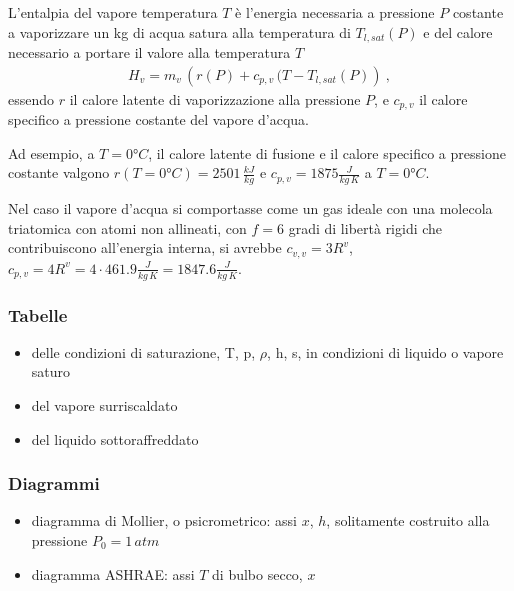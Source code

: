 \documentclass[letterpaper,10pt,italian]{jupyterBook}
\begin{document}
\sphinxAtStartPar
L’entalpia del vapore temperatura \(T\) è l’energia necessaria a pressione \(P\) costante a vaporizzare un kg di acqua satura alla temperatura di \(T_{l,sat}(P)\) e del calore necessario a portare il valore alla temperatura \(T\)
\begin{equation*}
\begin{split}H_v = m_v \, \left( r(P) + c_{p,v} \, (T-T_{l,sat}(P) \right) \ , \end{split}
\end{equation*}
\sphinxAtStartPar
essendo \(r\) il calore latente di vaporizzazione alla pressione \(P\), e \(c_{p,v}\) il calore specifico a pressione costante del vapore d’acqua.

\sphinxAtStartPar
Ad esempio, a \(T = 0°C\), il calore latente di fusione e il calore specifico a pressione costante valgono \(r(T = 0°C) = 2501 \, \frac{kJ}{kg}\) e \(c_{p,v} = 1875 \frac{J}{kg \, K}\) a \(T = 0°C\).

\sphinxAtStartPar
{}  Nel caso il vapore d’acqua si comportasse come un gas ideale con una molecola tri\sphinxhyphen{}atomica con atomi non allineati, con \(f = 6\) gradi di libertà rigidi che contribuiscono all’energia interna, si avrebbe \(c_{v,v} = 3 R^{v}\), \(c_{p,v} = 4 R^{v} = 4 \cdot 461.9 \frac{J}{kg \, K} = 1847.6 \frac{J}{kg \, K}\).


\subsubsection{Tabelle}
\label{\detokenize{ch/thermodynamics/humid-air:tabelle}}\begin{itemize}
\item {} 
\sphinxAtStartPar
delle condizioni di saturazione, T, p, \(\rho\), h, s, in condizioni di liquido o vapore saturo

\item {} 
\sphinxAtStartPar
del vapore surriscaldato

\item {} 
\sphinxAtStartPar
del liquido sottoraffreddato

\end{itemize}


\subsubsection{Diagrammi}
\label{\detokenize{ch/thermodynamics/humid-air:diagrammi}}\begin{itemize}
\item {} 
\sphinxAtStartPar
diagramma di Mollier, o psicrometrico: assi \(x\), \(h\), solitamente costruito alla pressione \(P_0 = 1 \, atm\)

\item {} 
\sphinxAtStartPar
diagramma ASHRAE: assi \(T\) di bulbo secco, \(x\)

\end{itemize}
\end{document}
